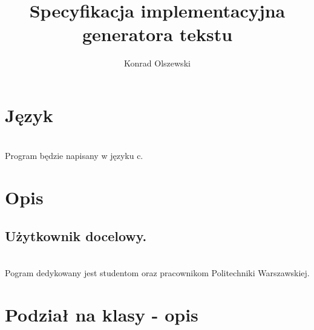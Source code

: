 \documentclass[12pt,a4paper]{article}
\title{Specyfikacja implementacyjna generatora tekstu}
\author{Konrad Olszewski}
\begin{document}
\maketitle
\tableofcontents


\section{Język}
\\
Program będzie napisany w języku c.
\section {Opis}
\subsection{Użytkownik docelowy.}
\\
Pogram dedykowany jest studentom oraz pracownikom Politechniki Warszawskiej.

\section{Podział na klasy - opis}
\end{document}
